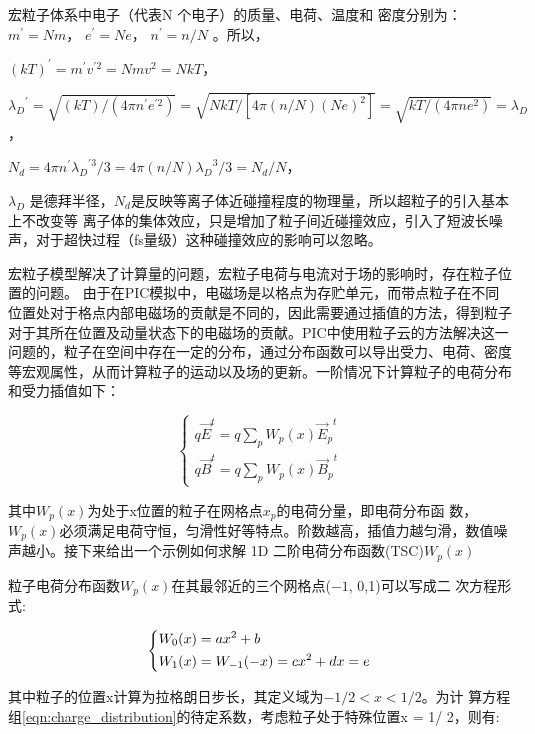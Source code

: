宏粒子体系中电子（代表N 个电子）的质量、电荷、温度和
密度分别为：$m^{'}=Nm$， $e^{'}=Ne$，  $n^{'}=n/N$ 。所以，

$(kT)^{'}  = m^{'}  v^{'2} = Nmv^2 = NkT$，

${{\lambda}_D}^{'} = \sqrt{ (kT)/(4 \pi n^{'} e^{'2})} = \sqrt{NkT/[4 \pi (n/N)(Ne)^2]} = \sqrt{ kT/(4 \pi ne^2 )}={{\lambda}_D}$，

$N_d=4\pi n^{'} {{\lambda}_D}^{'3}/3= 4 \pi (n/N) {{\lambda}_D}^{3} /3 = N_d/N $，

${{\lambda}_D} $ 是德拜半径，$N_d$是反映等离子体近碰撞程度的物理量，所以超粒子的引入基本上不改变等
离子体的集体效应，只是增加了粒子间近碰撞效应，引入了短波长噪声，对于超快过程（fs量级）这种碰撞效应的影响可以忽略。

宏粒子模型解决了计算量的问题，宏粒子电荷与电流对于场的影响时，存在粒子位置的问题。 由于在PIC模拟中，电磁场是以格点为存贮单元，而带点粒子在不同位置处对于格点内部电磁场的贡献是不同的，因此需要通过插值的方法，得到粒子对于其所在位置及动量状态下的电磁场的贡献。PIC中使用粒子云的方法解决这一问题的，粒子在空间中存在一定的分布，通过分布函数可以导出受力、电荷、密度等宏观属性，从而计算粒子的运动以及场的更新。一阶情况下计算粒子的电荷分布和受力插值如下：


\begin{equation}
\label{eqn:current_interpolate}
\begin{cases*}
q\vec{E}^t=q \sum_p W_p(x){\vec{E}_p}^t \\
q\vec{B}^t=q \sum_p W_p(x){\vec{B}_p}^t
\end{cases*}
\end{equation} 



其中$W_p(x)$为处于x位置的粒子在网格点$x_p$的电荷分量，即电荷分布函
数，$W_p(x)$必须满足电荷守恒，匀滑性好等特点。阶数越高，插值力越匀滑，数值噪声越小。接下来给出一个示例如何求解
1D 二阶电荷分布函数(TSC)$W_p(x)$

粒子电荷分布函数$W_p(x)$在其最邻近的三个网格点($−1$, 0,1)可以写成二
次方程形式:

\begin{equation}
\label{eqn:charge_distribution}
\begin{dcases*}
W_0(x)=ax^2+b \\
W_1(x)=W_{-1}(-x)=cx^2+dx=e
\end{dcases*}
\end{equation} 

其中粒子的位置x计算为拉格朗日步长，其定义域为$-1/2<x<1/2$。为计
算方程组\ref{eqn:charge_distribution}的待定系数，考虑粒子处于特殊位置x = 1/ 2，则有:

